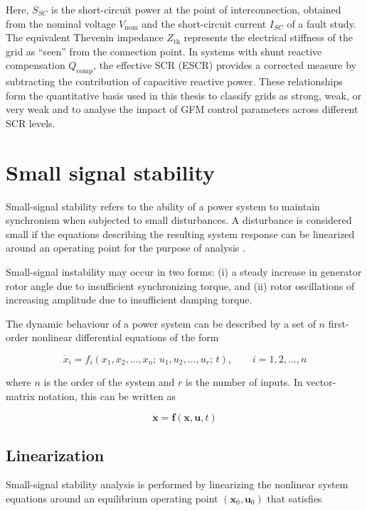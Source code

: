 Here, $S_{SC}$ is the short-circuit power at the point of interconnection, obtained from the nominal voltage $V_{\mathrm{nom}}$ and the short-circuit current $I_{SC}$ of a fault study. The equivalent Thevenin impedance $Z_{\mathrm{th}}$ represents the electrical stiffness of the grid as “seen” from the connection point. In systems with shunt reactive compensation $Q_{\mathrm{comp}}$, the effective SCR (ESCR) provides a corrected measure by subtracting the contribution of capacitive reactive power. These relationships form the quantitative basis used in this thesis to classify grids as strong, weak, or very weak and to analyse the impact of GFM control parameters across different SCR levels.

\section{Small signal stability}

Small-signal stability refers to the ability of a power system to maintain synchronism when subjected to small disturbances. A disturbance is considered small if the equations describing the resulting system response can be linearized around an operating point for the purpose of analysis \cite{kundur1994}.

Small-signal instability may occur in two forms: (i) a steady increase in generator rotor angle due to insufficient synchronizing torque, and (ii) rotor oscillations of increasing amplitude due to insufficient damping torque.

The dynamic behaviour of a power system can be described by a set of $n$ first-order nonlinear differential equations of the form

\begin{equation}
\dot{x}_i = f_i(x_1,x_2,\ldots,x_n;\,u_1,u_2,\ldots,u_r;\,t), 
\qquad i = 1,2,\ldots,n
\end{equation}

where $n$ is the order of the system and $r$ is the number of inputs. In vector-matrix notation, this can be written as

\begin{equation}
\dot{\mathbf{x}} = \mathbf{f}(\mathbf{x},\mathbf{u},t)
\end{equation}

\subsection{Linearization}

Small-signal stability analysis is performed by linearizing the nonlinear system equations around an equilibrium operating point $(\mathbf{x}_0,\mathbf{u}_0)$ that satisfies

